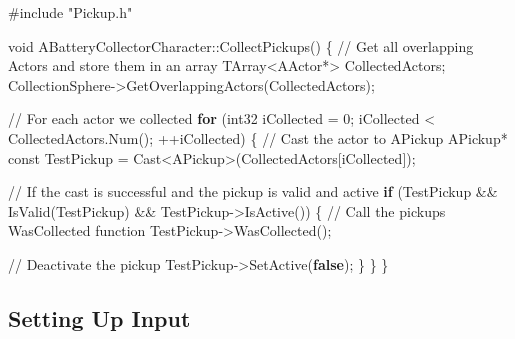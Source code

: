 \documentclass[
  letterpaper,
  DIV=11,
  numbers=noendperiod]{scrartcl}
\newenvironment{Shaded}{\begin{snugshade}}{\end{snugshade}}
\newcommand{\AttributeTok}[1]{\textcolor[rgb]{0.40,0.45,0.13}{#1}}
\newcommand{\CommentTok}[1]{\textcolor[rgb]{0.37,0.37,0.37}{#1}}
\newcommand{\ControlFlowTok}[1]{\textcolor[rgb]{0.00,0.23,0.31}{\textbf{#1}}}
\newcommand{\DataTypeTok}[1]{\textcolor[rgb]{0.68,0.00,0.00}{#1}}
\newcommand{\DecValTok}[1]{\textcolor[rgb]{0.68,0.00,0.00}{#1}}
\newcommand{\ImportTok}[1]{\textcolor[rgb]{0.00,0.46,0.62}{#1}}
\newcommand{\KeywordTok}[1]{\textcolor[rgb]{0.00,0.23,0.31}{\textbf{#1}}}
\newcommand{\NormalTok}[1]{\textcolor[rgb]{0.00,0.23,0.31}{#1}}
\newcommand{\OperatorTok}[1]{\textcolor[rgb]{0.37,0.37,0.37}{#1}}
\newcommand{\PreprocessorTok}[1]{\textcolor[rgb]{0.68,0.00,0.00}{#1}}
\begin{document}
\begin{Shaded}
\begin{Highlighting}[]
\PreprocessorTok{\#include }\ImportTok{"Pickup.h"}

\DataTypeTok{void}\NormalTok{ ABatteryCollectorCharacter}\OperatorTok{::}\NormalTok{CollectPickups}\OperatorTok{()}
\OperatorTok{\{}
    \CommentTok{// Get all overlapping Actors and store them in an array}
\NormalTok{    TArray}\OperatorTok{\textless{}}\NormalTok{AActor}\OperatorTok{*\textgreater{}}\NormalTok{ CollectedActors}\OperatorTok{;}
\NormalTok{    CollectionSphere}\OperatorTok{{-}\textgreater{}}\NormalTok{GetOverlappingActors}\OperatorTok{(}\NormalTok{CollectedActors}\OperatorTok{);}
    
    \CommentTok{// For each actor we collected}
    \ControlFlowTok{for} \OperatorTok{(}\NormalTok{int32 iCollected }\OperatorTok{=} \DecValTok{0}\OperatorTok{;}\NormalTok{ iCollected }\OperatorTok{\textless{}}\NormalTok{ CollectedActors}\OperatorTok{.}\NormalTok{Num}\OperatorTok{();} \OperatorTok{++}\NormalTok{iCollected}\OperatorTok{)}
    \OperatorTok{\{}
        \CommentTok{// Cast the actor to APickup}
\NormalTok{        APickup}\OperatorTok{*} \AttributeTok{const}\NormalTok{ TestPickup }\OperatorTok{=}\NormalTok{ Cast}\OperatorTok{\textless{}}\NormalTok{APickup}\OperatorTok{\textgreater{}(}\NormalTok{CollectedActors}\OperatorTok{[}\NormalTok{iCollected}\OperatorTok{]);}
        
        \CommentTok{// If the cast is successful and the pickup is valid and active}
        \ControlFlowTok{if} \OperatorTok{(}\NormalTok{TestPickup }\OperatorTok{\&\&}\NormalTok{ IsValid}\OperatorTok{(}\NormalTok{TestPickup}\OperatorTok{)} \OperatorTok{\&\&}\NormalTok{ TestPickup}\OperatorTok{{-}\textgreater{}}\NormalTok{IsActive}\OperatorTok{())}
        \OperatorTok{\{}
            \CommentTok{// Call the pickup\textquotesingle{}s WasCollected function}
\NormalTok{            TestPickup}\OperatorTok{{-}\textgreater{}}\NormalTok{WasCollected}\OperatorTok{();}
            
            \CommentTok{// Deactivate the pickup}
\NormalTok{            TestPickup}\OperatorTok{{-}\textgreater{}}\NormalTok{SetActive}\OperatorTok{(}\KeywordTok{false}\OperatorTok{);}
        \OperatorTok{\}}
    \OperatorTok{\}}
\OperatorTok{\}}
\end{Highlighting}
\end{Shaded}

\subsection{Setting Up Input}\label{setting-up-input}
\end{document}
